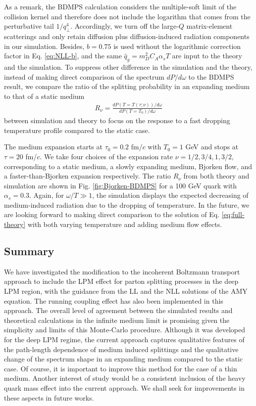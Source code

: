 As a remark, the BDMPS calculation considers the multiple-soft limit of the collision kernel and therefore does not include the logarithm that comes from the perturbative tail $1/q_\perp^4$. 
Accordingly, we turn off the large-$Q$ matrix-element scatterings and only retain diffusion plus diffusion-induced radiation components in our simulation.
Besides, $b=0.75$ is used without the logarithmic correction factor in Eq. \ref{eq:NLL-b}, and the same $\hat{q}_g = m_D^2 C_A\alpha_s T$ are input to the theory and the simulation.
To suppress other difference in the simulation and the theory, instead of making direct comparison of the spectrum $dP/d\omega$ to the BDMPS result, we compare the ratio of the splitting probability in an expanding medium to that of a static medium
\begin{eqnarray}
R_\nu = \frac{dP(T=T(\tau;\nu))/d\omega}{dP(T=T_0)/d\omega}
\end{eqnarray}
between simulation and theory to focus on the response to a fast dropping temperature profile compared to the static case.

The medium expansion starts at $\tau_0=0.2$ fm/$c$ with $T_0=1$ GeV and stops at $\tau = 20$ fm/$c$.
We take four choices of the expansion rate $\nu = 1/2, 3/4, 1, 3/2$, corresponding to a static medium, a slowly expanding medium, Bjorken flow, and a faster-than-Bjorken expansion respectively.
The ratio $R_\nu$ from both theory and simulation are shown in Fig. \ref{fig:Bjorken-BDMPS} for a 100 GeV quark with $\alpha_s=0.3$.
Again, for $\omega/T \gg 1$, the simulation displays the expected decreasing of medium-induced radiation due to the dropping of temperature.
In the future, we are looking forward to making direct comparison to the solution of Eq. \ref{eq:full-theory} with both varying temperature and adding medium flow effects.

\subsection{Summary}
We have investigated the modification to the incoherent Boltzmann transport approach to include the LPM effect for parton splitting processes in the deep LPM region, with the guidance from the LL and the NLL solutions of the AMY equation.
The running coupling effect has also been implemented in this approach.
The overall level of agreement between the simulated results and theoretical calculations in the infinite medium limit is promising given the simplicity and limits of this Monte-Carlo procedure. 
Although it was developed for the deep LPM regime, the current approach captures qualitative features of the path-length dependence of medium induced splittings and the qualitative change of the spectrum shape in an expanding medium compared to the static case.
Of course, it is important to improve this method for the case of a thin medium.
Another interest of study would be a consistent inclusion of the heavy quark mass effect into the current approach.
We shall seek for improvements in these aspects in future works.

